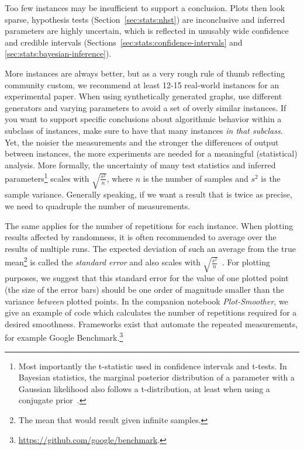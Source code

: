 \documentclass[algorithms,article,submit,moreauthors,pdftex]{Definitions/mdpi}
\newcommand{\changed}[1]{#1}
\newcommand{\removed}[1]{}
\begin{document}
Too few instances may be insufficient to support a conclusion.
Plots then look sparse, hypothesis tests (Section~\ref{sec:stats:nhst}) are inconclusive
and inferred parameters are highly uncertain, which is reflected in unusably wide confidence and credible intervals
(Sections~\ref{sec:stats:confidence-intervals} and \ref{sec:stats:bayesian-inference}).
\removed{Choosing too many instances, though, costs unnecessary time and expense.}
%
\changed{More instances are always better, but} as a very rough rule of thumb reflecting community custom,
 we recommend at least \changed{12-15 real-world} instances for an experimental paper.
 \changed{When using synthetically generated graphs, \removed{take care to} use different generators and varying parameters to avoid a set of overly similar instances.}
If you want to support specific conclusions about algorithmic behavior within a subclass of instances,
\removed{you should have} \changed{make sure to have that many} instances \emph{in that subclass}.
%
Yet, the noisier the measurements and the stronger the differences of output between instances, the more experiments are needed for a meaningful (statistical) analysis.
More formally, the uncertainty of many test statistics and inferred parameters\footnote{Most importantly the t-statistic used in confidence intervals and t-tests.
 In Bayesian statistics, the marginal posterior distribution of a parameter with a Gaussian likelihood also follows a t-distribution, at least when using a conjugate prior~\cite{bernardo2009bayesian}.
 } scales with $\sqrt{\frac{s^2}{n}}$, where \changed{$n$ is the number of samples and} $s^2$ is the sample variance.
 Generally speaking, if we want a result that is twice as precise, we need to quadruple the number of measurements.
%

The same applies for the number of repetitions for each instance.
When plotting results affected by randomness, it is often recommended to average over the results of multiple runs.
The expected deviation of such an average from the true mean\footnote{The mean that would result given infinite samples.} is called the \emph{standard error}
and also scales with \changed{$\sqrt{\frac{s^2}{n}}$}~\cite{Altman05}.
For plotting purposes, we suggest that this standard error for the value of one plotted point (\ie the size of the error bars) should be one order of magnitude smaller than the variance \emph{between} plotted points.
In the companion notebook \emph{Plot-Smoother}, we give an example of code which calculates the number of repetitions required for a desired smoothness.
Frameworks exist that automate the repeated measurements, for example Google Benchmark.\footnote{\url{https://github.com/google/benchmark}.}
\end{document}
